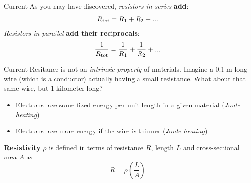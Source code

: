 \documentclass{beamer}
\begin{document}
\begin{frame}{Current}
As you may have discovered, \textit{resistors in series} \textbf{add}:
\begin{equation}
R_{\rm tot} = R_1 + R_2 + ...
\end{equation}
\textit{Resistors in parallel} \textbf{add their reciprocals}:
\begin{equation}
\frac{1}{R_{\rm tot}} = \frac{1}{R_1}+\frac{1}{R_2}+...
\end{equation}
\end{frame}

\begin{frame}{Current}
Resitance is not an \textit{intrinsic property} of materials.  Imagine a 0.1 m-long wire (which is a conductor) actually having a small resistance.  What about that same wire, but 1 kilometer long?
\begin{itemize}
\item Electrons lose some fixed energy per unit length in a given material (\textit{Joule heating})
\item Electrons lose more energy if the wire is thinner (\textit{Joule heating})
\end{itemize}
\textbf{Resistivity} $\rho$ is defined in terms of resistance $R$, length $L$ and cross-sectional area $A$ as
\begin{equation}
R = \rho \left( \frac{L}{A} \right)
\end{equation}
\end{frame}
\end{document}
